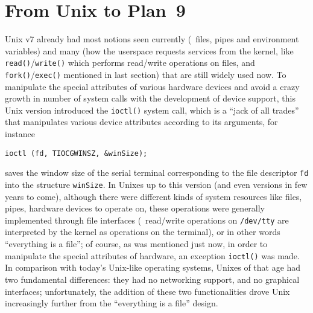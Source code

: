 \section{From Unix to Plan~9}\label{sec:plan9}

Unix v7 already had most notions seen currently
(\eg~files, pipes and environment variables) and many  (how the userspace requests services from the kernel, like
\verb|read()|/\verb|write()| which performs read/write operations on files,
and \verb|fork()|/\verb|exec()| mentioned in last section) that are still
widely used now.  To manipulate the special attributes of various hardware
devices and avoid a crazy growth in number of system calls with the development
of device support, this Unix version introduced the \verb|ioctl()| system call,
which is a ``jack of all trades'' that manipulates various device attributes
according to its arguments, for instance
\begin{quoting}
\begin{Verbatim}
ioctl (fd, TIOCGWINSZ, &winSize);
\end{Verbatim}
\end{quoting}
saves the window size of the serial terminal corresponding to the file
descriptor \verb|fd| into the structure \verb|winSize|.  In Unixes up to this
version (and even versions in few years to come), although there were different
kinds of system resources like files, pipes, hardware devices \etc{} to operate
on, these operations were generally implemented through file interfaces
(\eg~read/write operations on \verb|/dev/tty| are interpreted by the kernel
as operations on the terminal), or in other words ``everything is a file''; of
course, as was mentioned just now, in order to manipulate the special attributes
of hardware, an exception \verb|ioctl()| was made.  In comparison with today's
Unix-like operating systems, Unixes of that age had two fundamental differences:
they had no networking support, and no graphical interfaces; unfortunately,
the addition of these two functionalities drove Unix increasingly
further from the ``everything is a file'' design.

